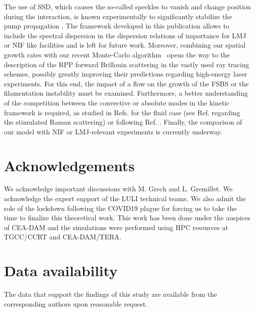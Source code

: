 \documentclass[
 reprint,
 superscriptaddress,
 amsmath,amssymb,
 aps,
]{revtex4-1}
\begin{document}
The use of SSD, which  causes the so-called speckles to vanish and change position during the interaction, is known  experimentally to significantly stabilize the pump propagation \cite[]{Berger_1995}. The framework developed in this publication allows to include the spectral dispersion in the dispersion relations of importance for LMJ or NIF like facilities  and is left for future work. Moreover, 
combining our spatial growth rates with our recent Monte-Carlo algorithm~\cite[]{POP_Debayle_2019}  opens the way to the description of the RPP forward Brillouin scattering   in the vastly used ray tracing schemes, possibly greatly improving their predictions regarding high-energy laser experiments. For this end, the impact of a flow on the growth of the FSBS or the filamentation instability must be examined. 
Furthermore, a better  understanding of the competition between the convective or absolute modes in the kinetic framework is required,   as studied  in Refs. \cite[]{phd-Grech,PRL_Grech_2009} for the fluid case  (see Ref. \cite[]{POP_Grismayer_2004}  regarding the stimulated Raman scattering) or  following   Ref. \cite[]{PR_Hall_68}.
Finally, the comparison of our model with NIF or LMJ-relevant experiments is currently underway. 

\section*{Acknowledgements}
We acknowledge important discussions with M. Grech and L. Gremillet. We acknowledge the expert support of the LULI technical teams. We also admit the role of the lockdown following the COVID19 plague for forcing us to take the time to finalize this theoretical work. This work has been done under the auspices of CEA-DAM  and the simulations were performed using HPC resources at TGCC/CCRT and CEA-DAM/TERA.

\section*{Data availability}
The data that support the findings of this study are available from the corresponding authors upon reasonable request.

\appendix
\end{document}
